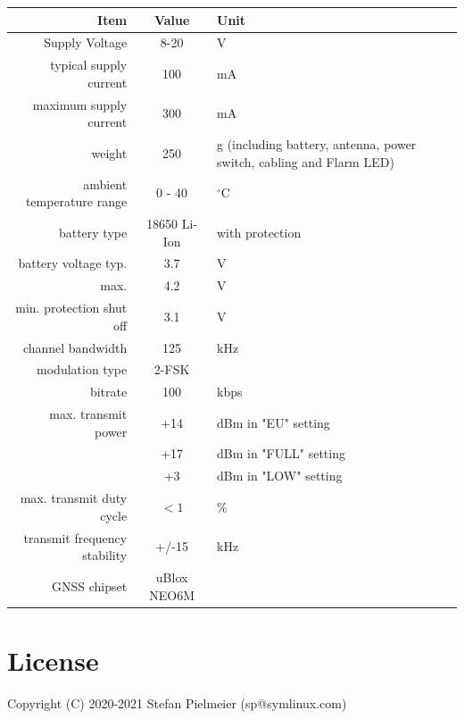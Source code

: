 \documentclass[10pt,a4paper]{article}
\begin{document}
\begin{tabular}{r|c|p{6cm}}\hline
Item & Value & Unit\\\hline\hline
Supply Voltage & 8-20 & V\\\hline
typical supply current & 100 & mA\\\hline
maximum supply current & 300 & mA  \\\hline
weight & 250 & g (including battery, antenna, power switch, cabling and Flarm LED)\\\hline
ambient temperature range & 0 - 40 & $^\circ$C \\\hline
battery type & 18650 Li-Ion & with protection\\
battery voltage typ. & 3.7 & V\\
max. & 4.2 & V\\
min. protection shut off & 3.1 & V\\\hline
channel bandwidth & 125 & kHz\\
modulation type & 2-FSK & \\
bitrate & 100 & kbps\\
max. transmit power & +14 & dBm in "EU" setting\\
 & +17 & dBm in "FULL" setting\\
 & +3 & dBm in "LOW" setting\\
max. transmit duty cycle & $< 1$ & \%\\
transmit frequency stability & +/-15 & kHz\\\hline
GNSS chipset & uBlox NEO6M & \\\hline

\end{tabular}

\section{License}
Copyright (C)  2020-2021 Stefan Pielmeier (sp@symlinux.com)\\

\begin{center}
\end{center}    
\end{document}
